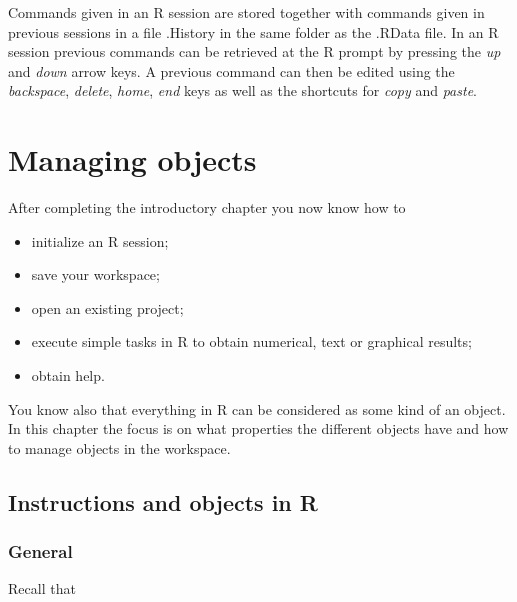\documentclass[
]{book}
\providecommand{\tightlist}{%
  \setlength{\itemsep}{0pt}\setlength{\parskip}{0pt}}
\begin{document}
Commands given in an R session are stored together with commands given in previous sessions in a file {.History} in the same folder as the {.RData} file. In an R session previous commands can be retrieved at the R prompt by pressing the \emph{up} and \emph{down} arrow keys. A previous command can then be edited using the \emph{backspace}, \emph{delete}, \emph{home}, \emph{end} keys as well as the shortcuts for \emph{copy} and \emph{paste}.

\chapter{Managing objects}\label{objects}

After completing the introductory chapter you now know how to

\begin{itemize}
\tightlist
\item
  initialize an R session;
\item
  save your workspace;
\item
  open an existing project;
\item
  execute simple tasks in R to obtain numerical, text or graphical results;
\item
  obtain help.
\end{itemize}

You know also that everything in R can be considered as some kind of an object. In this chapter the focus is on what properties the different objects have and how to manage objects in the workspace.

\section{Instructions and objects in R}\label{instructions-and-objects-in-r}

\subsection{General}\label{general}

Recall that
\end{document}
